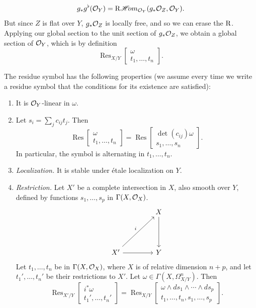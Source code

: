 \[
g_*g^{\flat}(\mathcal{O}_Y) = \mathop{\mathrm{R}\mathscr{H}\!om}\nolimits_{\mathcal{O}_Y}(g_*\mathcal{O}_Z,\mathcal{O}_Y).
\]
But since $Z$ is flat over $Y$, $g_*\mathcal{O}_Z$ is locally free, and so we can erase the $\operatorname{R}$. Applying our global section to the unit section of $g_*\mathcal{O}_Z$, we obtain a global section of $\mathcal{O}_Y$, which is by definition
\[
\operatorname{Res}_{X/Y}\begin{bmatrix} \omega \\ t_1,\dots,t_n \end{bmatrix}.
\]

The residue symbol has the following properties (we assume every time we write a residue symbol that the conditions for its existence are satisfied):

\begin{enumerate}
\item[(R0)]\label{res:R0} It is $\mathcal{O}_Y$-linear in $\omega$.
\item[(R1)]\label{res:R1} Let $s_i=\sum_j c_{ij}t_j$. Then
\[
\operatorname{Res}\begin{bmatrix} \omega \\ t_1,\dots,t_n \end{bmatrix} = \operatorname{Res}\begin{bmatrix} \det(c_{ij})\omega \\ s_1,\dots,s_n \end{bmatrix}.
\]
In particular, the symbol is alternating in $t_1,\dots,t_n$.
\item[(R2)]\label{res:R2} \emph{Localization.} It is stable under \'etale localization on $Y$.
\item[(R3)]\label{res:R3} \emph{Restriction.} Let $X'$ be a complete intersection in $X$, also smooth over $Y$, defined by functions $s_1,\dots,s_p$ in $\Gamma(X,\mathcal{O}_X)$.
\[
\begin{tikzcd}[row sep=1.5cm, column sep=1.5cm]
	& X \arrow[d] \\
	X' \arrow[ur, "i"] \arrow[r] & Y
\end{tikzcd}
\]
Let $t_1,\dots,t_n$ be in $\Gamma(X,\mathcal{O}_X)$, where $X$ is of relative dimension $n+p$, and let $t_1',\dots,t_n'$ be their restrictions to $X'$. Let $\omega\in\Gamma(X,\Omega_{X/Y}^n)$. Then
\[
\operatorname{Res}_{X'/Y}\begin{bmatrix} i^*\omega \\ t_1',\dots,t_n' \end{bmatrix} = \operatorname{Res}_{X/Y}\begin{bmatrix} \omega\wedge ds_1\wedge\cdots\wedge ds_p \\ t_1,\dots,t_n,s_1,\dots,s_p \end{bmatrix}.
\]
\end{enumerate}
